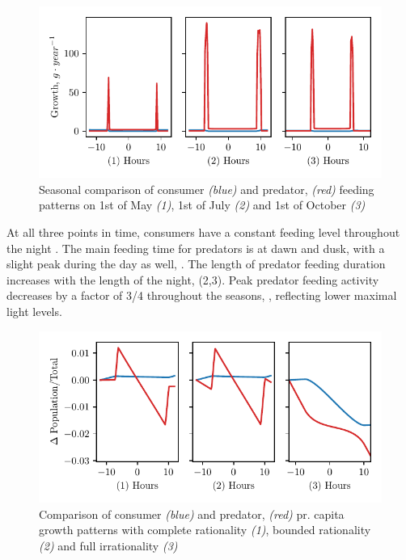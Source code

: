 \begin{figure}[H]
\includegraphics{plots/growth_short_rational.pdf}
\caption{Seasonal comparison of consumer \emph{(blue)} and predator, \emph{(red)} feeding patterns on 1st of May \emph{(1)}, 1st of July \emph{(2)} and 1st of October \emph{(3)}}
\label{fig:growth_short_rational}
\end{figure}
At all three points in time, consumers have a constant feeding level throughout the night . The main feeding time for predators is at dawn and dusk, with a slight peak during the day as well, . The length of predator feeding duration increases with the length of the night,  (2,3). Peak predator feeding activity decreases by a factor of 3/4 throughout the seasons, , reflecting lower maximal light levels.
\begin{figure}[H]
  \begin{centering}
\includegraphics{plots/pop_dyn_comp_full_semi_none.pdf}
\end{centering}
\caption{Comparison of consumer \emph{(blue)} and predator, \emph{(red)} pr. capita growth patterns with complete rationality \emph{(1)}, bounded rationality \emph{(2)} and full irrationality \emph{(3)}}
\label{fig:pop_short_term}
\end{figure}

